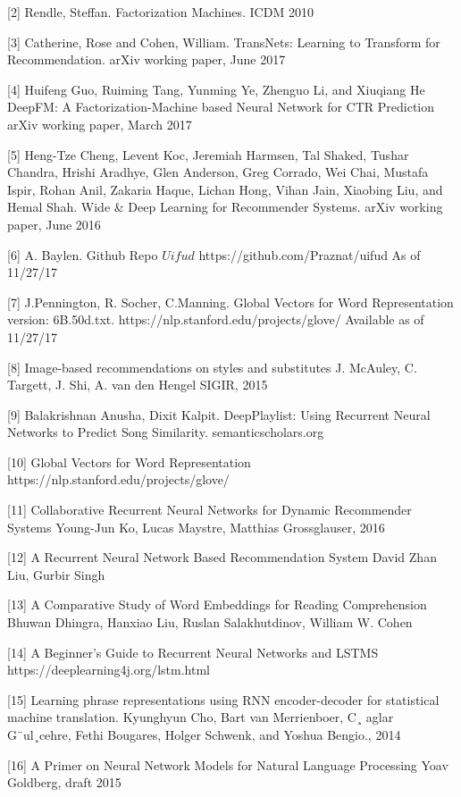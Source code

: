 \documentclass[10pt,twocolumn,letterpaper]{article}
\begin{document}
[2] Rendle, Steffan. Factorization Machines. ICDM 2010

[3] Catherine, Rose and Cohen, William. TransNets: Learning to Transform
for Recommendation. arXiv working paper, June 2017

[4] Huifeng Guo, Ruiming Tang, Yunming Ye, Zhenguo Li, and Xiuqiang He
DeepFM: A Factorization-Machine based Neural Network for CTR Prediction
arXiv working paper, March 2017

[5] Heng-Tze Cheng, Levent Koc, Jeremiah Harmsen, Tal Shaked, Tushar Chandra, Hrishi Aradhye, Glen Anderson, Greg Corrado, Wei Chai, Mustafa Ispir, Rohan Anil, Zakaria Haque, Lichan Hong, Vihan Jain, Xiaobing Liu, and Hemal Shah.
Wide \& Deep Learning for Recommender Systems. arXiv working paper, June 2016

[6] A. Baylen. Github Repo $Uifud$
https://github.com/Praznat/uifud
As of 11/27/17 

[7] J.Pennington, R. Socher, C.Manning. Global Vectors for Word Representation 
version: 6B.50d.txt. https://nlp.stanford.edu/projects/glove/ 
Available as of 11/27/17 

[8] Image-based recommendations on styles and substitutes
J. McAuley, C. Targett, J. Shi, A. van den Hengel
SIGIR, 2015

[9] Balakrishnan Anusha, Dixit Kalpit. DeepPlaylist: Using Recurrent Neural Networks to Predict Song Similarity. semanticscholars.org 

[10] Global Vectors for Word Representation
https://nlp.stanford.edu/projects/glove/

[11] Collaborative Recurrent Neural Networks for Dynamic Recommender Systems
Young-Jun Ko, Lucas Maystre, Matthias Grossglauser, 2016 

[12] A Recurrent Neural Network Based Recommendation System
David Zhan Liu, Gurbir Singh

[13] A Comparative Study of Word Embeddings for Reading Comprehension
Bhuwan Dhingra, Hanxiao Liu, Ruslan Salakhutdinov, William W. Cohen

[14] A Beginner's Guide to Recurrent Neural Networks and LSTMS
https://deeplearning4j.org/lstm.html

[15] Learning phrase representations using RNN encoder-decoder for statistical machine
translation.
Kyunghyun Cho, Bart van Merrienboer, C¸ aglar G¨ul¸cehre, Fethi Bougares, Holger Schwenk, and
Yoshua Bengio., 2014 

[16] A Primer on Neural Network Models for Natural Language Processing
Yoav Goldberg, draft 2015
\end{document}

